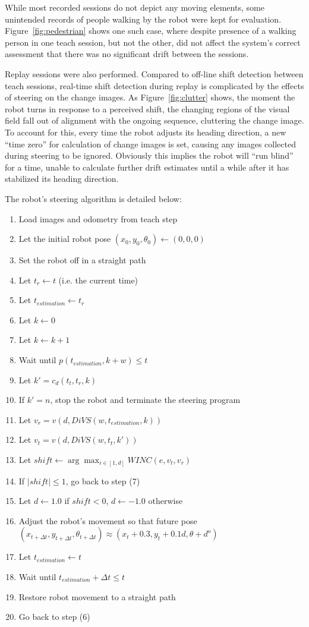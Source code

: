 \documentclass[twocolumn, 9pt,fleqn]{jsproceedings}
\begin{document}
While most recorded sessions do not depict any moving elements, some unintended records of people walking by the robot were kept for evaluation. Figure~\ref{fig:pedestrian} shows one such case, where despite presence of a walking person in one teach session, but not the other, did not affect the system's correct assessment that there was no significant drift between the sessions.

Replay sessions were also performed. Compared to off-line shift detection between teach sessions, real-time shift detection during replay is complicated by the effects of steering on the change images. As Figure~\ref{fig:clutter} shows, the moment the robot turns in response to a perceived shift, the changing regions of the visual field fall out of alignment with the ongoing sequence, cluttering the change image. To account for this, every time the robot adjusts its heading direction, a new ``time zero'' for calculation of change images is set, causing any images collected during steering to be ignored. Obviously this implies the robot will ``run blind'' for a time, unable to calculate further drift estimates until a while after it has stabilized its heading direction.

The robot's steering algorithm is detailed below:

\begin{enumerate}
\item Load images and odometry from teach step
\item Let the initial robot pose $(x_0, y_0, \theta_0) \gets (0, 0, 0)$
\item Set the robot off in a straight path
\item Let $t_r \gets t$ (i.e. the current time)
\item Let $t_{estimation} \gets t_r$
\item Let $k \gets 0$
\item Let $k \gets k + 1$
\item Wait until $p(t_{estimation}, k+w) \leq t$
\item Let $k' = c_d(t_t, t_r, k)$
\item If $k' = n$, stop the robot and terminate the steering program
\item Let $v_r = v(d, DiVS(w, t_{estimation}, k))$
\item Let $v_t = v(d, DiVS(w, t_t, k'))$
\item Let $shift \gets \arg \max_{i \in [1, d]}{WINC(e, v_t, v_r)}$
\item If $|shift| \leq 1$, go back to step (7)
\item Let $d \gets 1.0$ if $shift < 0$, $d \gets -1.0$ otherwise
\item Adjust the robot's movement so that future pose $(x_{t+\Delta t}, y_{t+\Delta t}, \theta_{t+\Delta t}) \approx (x_t + 0.3, y_t + 0.1d, \theta + d^o)$
\item Let $t_{estimation} \gets t$
\item Wait until $t_{estimation} + \Delta t \leq t$
\item Restore robot movement to a straight path
\item Go back to step (6)
\end{enumerate}
\end{document}
